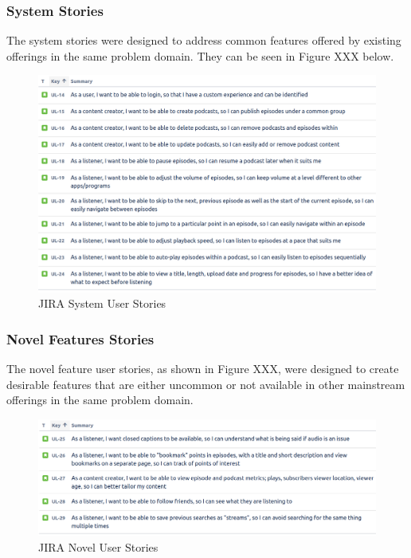 \documentclass[12pt]{article}
\begin{document}
\subsubsection{System Stories}

The system stories were designed to address common features offered by existing offerings in the same problem domain. 
They can be seen in Figure XXX below.

\begin{figure}[h]
    \centering
    \includegraphics[width=\textwidth]{resources/system_stories}
    \caption{JIRA System User Stories}
    \label{fig:background}
\end{figure}

\subsubsection{Novel Features Stories}

The novel feature user stories, as shown in Figure XXX, were designed to create desirable features that are either uncommon or not 
available in other mainstream offerings in the same problem domain.

\begin{figure}[h]
    \centering
    \includegraphics[width=\textwidth]{resources/novel_stories}
    \caption{JIRA Novel User Stories}
    \label{fig:background}
\end{figure}
\end{document}
